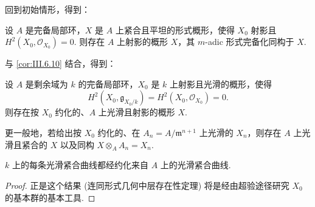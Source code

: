回到初始情形，得到：

\begin{proposition}\label{prop:III.7.2}
设 $A$ 是完备局部环，$X$ 是 $A$ 上紧合且平坦的形式概形，使得 $X_0$ 射影且 $H^2(X_0, \mathcal{O}_{X_0}) = 0$. 则存在 $A$ 上射影的概形 $X$，其 $m$-adic 形式完备化同构于 $X$.
\end{proposition}

与 \ref{cor:III.6.10} 结合，得到：

\begin{theorem}\label{thm:III.7.3}
设 $A$ 是剩余域为 $k$ 的完备局部环，$X_0$ 是 $k$ 上射影且光滑的概形，使得
\[
H^2(X_0, \mathfrak{g}_{X_0/k}) = H^2(X_0, \mathcal{O}_{X_0}) = 0.
\]
则存在按 $X_0$ 约化的、$A$ 上光滑且射影的概形 $X$.
\end{theorem}

更一般地，若给出按 $X_0$ 约化的、在 $A_n = A/\mathfrak{m}^{n+1}$ 上光滑的 $X_n$，则存在 $A$ 上光滑且紧合的 $X$ 以及同构 $X \otimes_A A_n = X_n$.

\begin{corollary}\label{cor:III.7.4}
$k$ 上的每条光滑紧合曲线都经约化来自 $A$ 上的光滑紧合曲线.
\end{corollary}

\begin{proof}
正是这个结果 (连同形式几何中层存在性定理) 将是经由超验途径研究 $X_0$ 的基本群的基本工具.
\end{proof}

